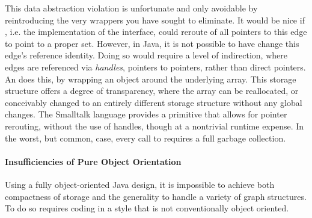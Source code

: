 This data abstraction violation is unfortunate and only avoidable by
reintroducing the very wrappers you have sought to eliminate. It would be nice if
, i.e. the implementation of the  interface, could
reroute of all pointers to this edge to point to a proper set. However, in Java,
it is not possible to have  change this edge's reference
identity. Doing so would require a level of indirection, where edges are
referenced via \emph{handles}, pointers to pointers, rather than direct
pointers. An  does this, by wrapping an object
around the underlying array. This storage structure offers a degree of
transparency, where the array can be reallocated, or conceivably changed to an
entirely different storage structure without any global changes. The Smalltalk
language provides a 
primitive that allows for pointer rerouting,
without the use of handles, though at a nontrivial runtime expense. In the worst,
but common, case, every call to  requires a full garbage collection.

\paragraph{Insufficiencies of Pure Object Orientation}
Using a fully object-oriented Java design, it is impossible to achieve both
compactness of storage and the generality to handle a variety of graph
structures. To do so requires coding in a style that is not conventionally object
oriented.

